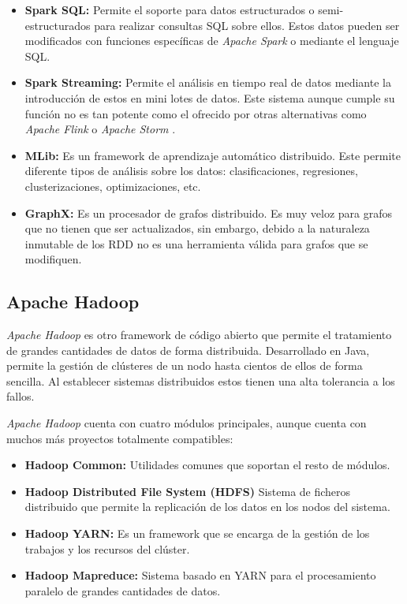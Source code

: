 \begin{itemize}
\item \textbf{Spark SQL:} Permite el soporte para datos estructurados o semi-estructurados para realizar consultas \gls{SQL} sobre ellos. Estos datos pueden ser modificados con funciones específicas de \textit{Apache Spark} o mediante el lenguaje \gls{SQL}.

\item \textbf{Spark Streaming:} Permite el análisis en tiempo real de datos mediante la introducción de estos en mini lotes de datos. Este sistema aunque cumple su función no es tan potente como el ofrecido por otras alternativas como \textit{Apache Flink} \cite{flink} o \textit{Apache Storm} \cite{storm}.

\item \textbf{MLib:} Es un \gls{framework} de aprendizaje automático distribuido. Este permite diferente tipos de análisis sobre los datos: clasificaciones, regresiones, clusterizaciones, optimizaciones, etc.

\item \textbf{GraphX:} Es un procesador de grafos distribuido. Es muy veloz para grafos que no tienen que ser actualizados, sin embargo, debido a la naturaleza inmutable de los \gls{RDD} no es una herramienta válida para grafos que se modifiquen.
\end{itemize}

\subsection{Apache Hadoop}
\textit{Apache Hadoop} \cite{hadoop} es otro \gls{framework} de código abierto que permite el tratamiento de grandes cantidades de datos de forma distribuida. Desarrollado en Java, permite la gestión de clústeres de un nodo hasta cientos de ellos de forma sencilla. Al establecer sistemas distribuidos estos tienen una alta tolerancia a los fallos.

\textit{Apache Hadoop} cuenta con cuatro módulos principales, aunque cuenta con muchos más proyectos totalmente compatibles: 

\begin{itemize}
\item \textbf{Hadoop Common:} Utilidades comunes que soportan el resto de módulos.

\item \textbf{Hadoop Distributed File System (\gls{HDFS})} Sistema de ficheros distribuido que permite la replicación de los datos en los nodos del sistema.

\item \textbf{Hadoop YARN:} Es un \gls{framework} que se encarga de la gestión de los trabajos y los recursos del clúster.

\item \textbf{Hadoop Mapreduce:} Sistema basado en YARN para el procesamiento paralelo de grandes cantidades de datos.
\end{itemize}


